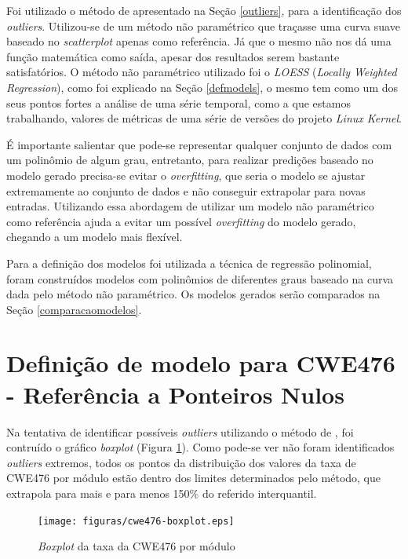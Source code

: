 Foi utilizado o método de  apresentado na Seção
\ref{outliers}, para a identificação dos \textit{outliers}. Utilizou-se de um
método não paramétrico que traçasse uma curva suave baseado no
\textit{scatterplot} apenas como referência. Já que o mesmo não nos dá uma função
matemática como saída, apesar dos resultados serem bastante satisfatórios.
O método não paramétrico utilizado foi o \textit{LOESS} (\textit{Locally
 Weighted Regression}), como foi explicado na Seção \ref{defmodels}, o mesmo tem
 como um dos seus pontos fortes a análise de uma série temporal, como a que
 estamos trabalhando, valores de métricas de uma série de versões do projeto
 \textit{Linux Kernel}.
 
 É importante salientar que pode-se representar qualquer conjunto de dados com
 um polinômio de algum grau, entretanto, para realizar predições baseado no
 modelo gerado precisa-se evitar o \textit{overfitting}, que seria o modelo se
 ajustar extremamente ao conjunto de dados e não conseguir extrapolar para novas
 entradas. Utilizando essa abordagem de utilizar um modelo não paramétrico como
 referência ajuda a evitar um possível \textit{overfitting} do modelo gerado,
 chegando a um modelo mais flexível.

Para a definição dos modelos foi utilizada a técnica de regressão polinomial,
foram construídos modelos com polinômios de diferentes graus baseado na curva
dada pelo método não paramétrico. Os modelos gerados serão comparados na Seção
\ref{comparacaomodelos}.

\section{Definição de modelo para CWE476 - Referência a Ponteiros Nulos}

Na tentativa de identificar possíveis \textit{outliers} utilizando o método de
, foi contruído o gráfico \textit{boxplot} (Figura
\ref{fig:cwe476-boxplot}). Como pode-se ver não foram identificados
\textit{outliers} extremos, todos os pontos da distribuição dos valores da taxa
de CWE476 por módulo estão dentro dos limites determinados pelo método, que
extrapola para mais e para menos 150\% do referido interquantil.

\begin{figure}[h]
  \centering
  \texttt{[image: figuras/cwe476-boxplot.eps]}
      \caption{\textit{Boxplot} da taxa da CWE476 por módulo}
  \label{fig:cwe476-boxplot}
\end{figure}

